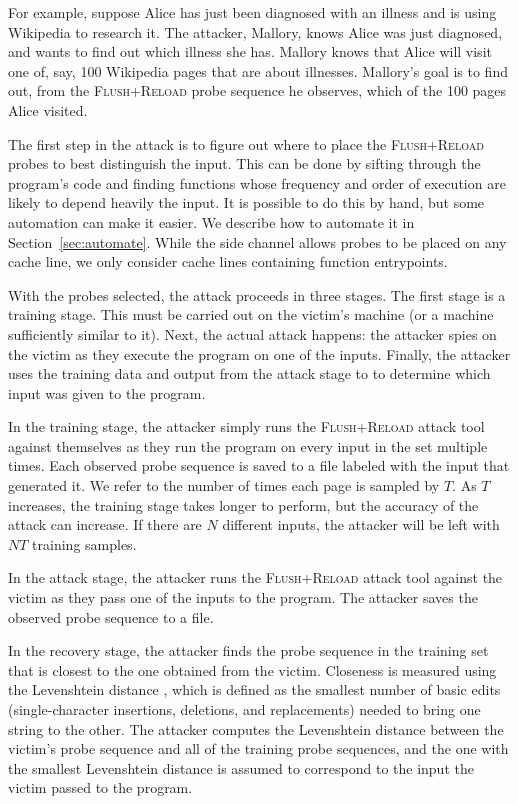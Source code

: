 \documentclass[letterpaper,twocolumn,10pt]{article}
\begin{document}
For example, suppose Alice has just been diagnosed with an illness and is using
Wikipedia to research it. The attacker, Mallory, knows Alice was just diagnosed,
and wants to find out which illness she has. Mallory knows that Alice will visit
one of, say, 100 Wikipedia pages that are about illnesses. Mallory's goal is to
find out, from the \textsc{Flush+Reload} probe sequence he observes, which of
the 100 pages Alice visited.

The first step in the attack is to figure out where to place the
\textsc{Flush+Reload} probes to best distinguish the input. This can be done by
sifting through the program's code and finding functions whose frequency and
order of execution are likely to depend heavily the input. It is possible to do
this by hand, but some automation can make it easier. We describe how to
automate it in Section~\ref{sec:automate}. While the side channel allows probes
to be placed on any cache line, we only consider cache lines containing function
entrypoints.

With the probes selected, the attack proceeds in three stages. The first stage
is a training stage. This must be carried out on the victim's machine (or
a machine sufficiently similar to it). Next, the actual attack happens: the attacker
spies on the victim as they execute the program on one of the inputs. Finally,
the attacker uses the training data and output from the attack stage to to
determine which input was given to the program.

In the training stage, the attacker simply runs the \textsc{Flush+Reload} attack
tool against themselves as they run the program on every input in the set
multiple times. Each observed probe sequence is saved to a file labeled with the
input that generated it. We refer to the number of times each page is sampled by
$T$. As $T$ increases, the training stage takes longer to perform, but the
accuracy of the attack can increase. If there are $N$ different inputs, the
attacker will be left with $NT$ training samples.

In the attack stage, the attacker runs the \textsc{Flush+Reload} attack tool
against the victim as they pass one of the inputs to the program. The attacker
saves the observed probe sequence to a file.

In the recovery stage, the attacker finds the probe sequence in the training set
that is closest to the one obtained from the victim. Closeness is measured using
the Levenshtein distance \cite{levenshtein1966binary}, which is defined as the
smallest number of basic edits (single-character insertions, deletions, and
replacements) needed to bring one string to the other. The attacker computes the
Levenshtein distance between the victim's probe sequence and all of the training
probe sequences, and the one with the smallest Levenshtein distance is assumed
to correspond to the input the victim passed to the program.
\end{document}
